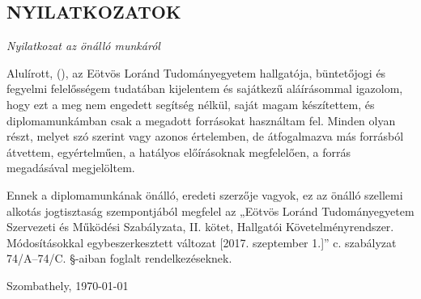 \selecthungarian
{}
\setcounter{page}{6}
\cleardoublepage %
\begin{center}
\section*{NYILATKOZATOK}
\end{center}

\vspace{0.5cm}



\begin{center}
\emph{Nyilatkozat az önálló munkáról}
\end{center}
Alulírott,  \emph{\authorFamilyName{} \authorGivenName} (\neptun), az Eötvös Loránd Tudományegyetem hallgatója, büntetőjogi és fegyelmi felelősségem tudatában kijelentem és sajátkezű aláírásommal igazolom, hogy ezt a \MakeLowercase{\munkatipustHU} meg nem engedett segítség nélkül, saját magam készítettem, és diplomamunkámban csak a megadott forrásokat használtam fel. Minden olyan részt, melyet szó szerint vagy azonos értelemben, de átfogalmazva más forrásból átvettem, egyértelműen, a hatályos előírásoknak megfelelően, a forrás megadásával megjelöltem.

Ennek a diplomamunkának önálló, eredeti szerzője vagyok, ez az önálló szellemi alkotás jogtisztaság szempontjából megfelel az „Eötvös Loránd Tudományegyetem Szervezeti és Működési Szabályzata, II. kötet, Hallgatói Követelményrendszer. Módosításokkal egybeszerkesztett változat [2017. szeptember 1.]” c. szabályzat 74/A–74/C. §-aiban foglalt rendelkezéseknek.

\begin{flushleft}
Szombathely, \today
\end{flushleft}

\begin{flushright}
 \makebox[7cm]{\rule{6cm}{.4pt}}\\
\end{flushright}


\vfill
\clearpage

\selectthesislanguage

\setcounter{romanPage}{\value{page}}

